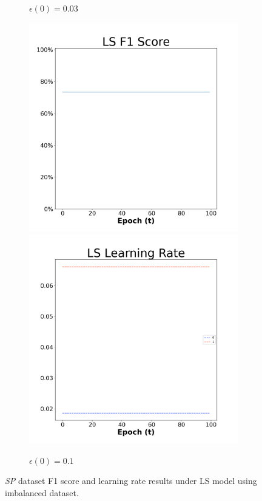 \begin{figure}[H]
\begin{subfigure}{0.3\textwidth}
  \caption{$\epsilon(0)=0.03$}
\end{subfigure}\hfil %
\begin{subfigure}{0.3\textwidth}
  \includegraphics[width=\linewidth]{images/exper2/SP/LS_0.1_f1.png}
  \includegraphics[width=\linewidth]{images/exper2/SP/LS_0.1_lr.png}
  \caption{$\epsilon(0)=0.1$}
\end{subfigure}

\caption{\textit{SP} dataset F1 score and learning rate results under LS model using imbalanced dataset.}
\end{figure}

